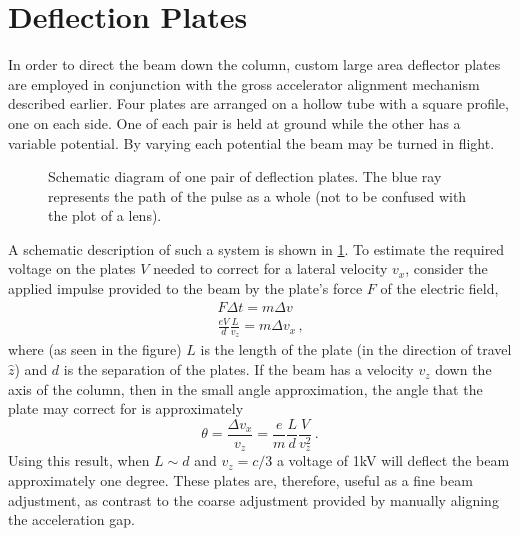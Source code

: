 
\section{Deflection Plates}

In order to direct the beam down the column, custom large area deflector plates are employed in conjunction with the gross accelerator alignment mechanism described earlier.
Four plates are arranged on a hollow tube with a square profile, one on each side.
One of each pair is held at ground while the other has a variable potential.
By varying each potential the beam may be turned in flight.

\begin{figure}
  \centering
  
  \caption[Schematic diagram of one pair of deflection plates]{
    Schematic diagram of one pair of deflection plates.
    The blue ray represents the path of the pulse as a whole (not to be confused with the plot of a lens).
  }
  \label{fig:deflector_schematic}
\end{figure}

A schematic description of such a system is shown in \ref{fig:deflector_schematic}.
To estimate the required voltage on the plates $V$ needed to correct for a lateral velocity $v_x$, consider the applied impulse provided to the beam by the plate's force $F$ of the electric field,
\begin{gather}
  F \Delta t = m \Delta v \\
  \frac{ e V }{ d } \frac{ L }{ v_z } = m \Delta v_x \,\text{,}
\end{gather}
where (as seen in the figure) $L$ is the length of the plate (in the direction of travel $\hat{z}$) and $d$ is the separation of the plates.
If the beam has a velocity $v_z$ down the axis of the column, then in the small angle approximation, the angle that the plate may correct for is approximately
\begin{equation}
  \theta = \frac{ \Delta v_x }{ v_z } = \frac{ e }{ m } \frac{ L }{ d } \frac{ V }{ v_z^2 } \,\text{.}
\end{equation}
Using this result, when $L \sim d$ and $v_z = c/3$ a voltage of 1kV will deflect the beam approximately one degree.
These plates are, therefore, useful as a fine beam adjustment, as contrast to the coarse adjustment provided by manually aligning the acceleration gap.

